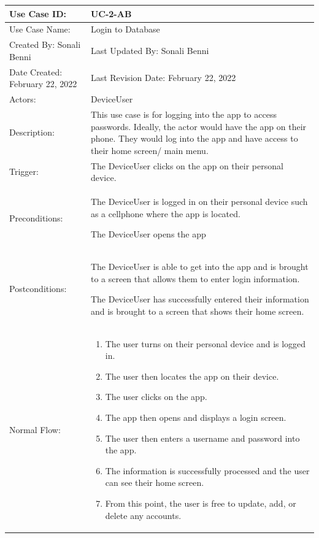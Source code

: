 \documentclass[stu]{apa7}
\newcommand{\nextitem}{\par\hspace*{\labelsep}\textbullet\hspace*{\labelsep}}
\begin{document}
\scriptsize{\begin{xltabular}{\textwidth}{|l|X|}
  \hline Use Case ID: & UC-2-AB \\ \hline

  Use Case Name: & Login to Database \\ \hline

  Created By: Sonali Benni & Last Updated By: Sonali Benni \\ \hline

  Date Created: February 22, 2022 & Last Revision Date: February 22, 2022 \\ \hline

  Actors: & \nextitem DeviceUser \\ \hline
  
  Description: & This use case is for logging into the app to access passwords. Ideally, the actor would have the app on their phone. They would log into the app and have access to their home screen/ main menu. \\ \hline

  Trigger: & The DeviceUser clicks on the app on their personal device. \\ \hline

  Preconditions: & \nextitem The DeviceUser is logged in on their personal device such as a cellphone where the app is located. \nextitem The DeviceUser opens the app \\ \hline

  Postconditions: & \nextitem The DeviceUser is able to get into the app and is brought to a screen that allows them to enter login information.
    \nextitem The DeviceUser has successfully entered their information and is brought to a screen that shows their home screen.  \\ \hline

  Normal Flow: & 
    \begin{enumerate}
      \item The user turns on their personal device and is logged in. 
      \item The user then locates the app on their device. 
      \item The user clicks on the app.
      \item The app then opens and displays a login screen.
      \item The user then enters a username and password into the app.
      \item The information is successfully processed and the user can see their home screen.
      \item From this point, the user is free to update, add, or delete any accounts.
    \end{enumerate} \\ \hline


\end{xltabular}}
\end{document}
